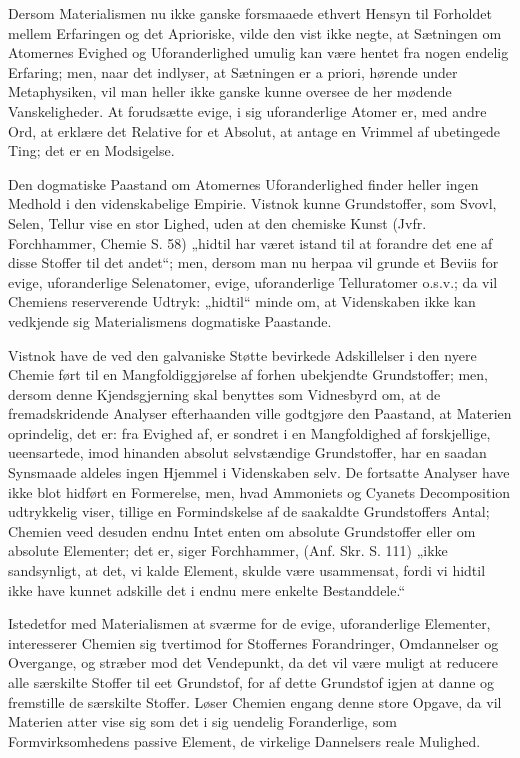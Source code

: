 \documentclass[12pt]{book}
\newcommand{\opage}[1]{\marginnote{\footnotesize\textit{[#1]}}}
\begin{document}
Dersom Materialismen nu ikke ganske forsmaaede ethvert Hensyn til Forholdet mellem Erfaringen og det
Aprioriske, vilde den vist ikke negte, at Sætningen om Atomernes Evighed og Uforanderlighed umulig kan
være hentet fra nogen endelig Erfaring; men, naar det indlyser, at Sætningen er a priori, hørende
under Metaphysiken, vil man heller ikke ganske kunne oversee de her mødende Vanskeligheder. At
forudsætte evige, i sig uforanderlige Atomer er, med andre
\opage{195} Ord, at erklære det Relative for et Absolut, at antage en Vrimmel af ubetingede Ting; det er en
Modsigelse.

Den dogmatiske Paastand om Atomernes Uforanderlighed finder heller ingen Medhold i den videnskabelige
Empirie. Vistnok kunne Grundstoffer, som Svovl, Selen, Tellur vise en stor Lighed, uden at den
chemiske Kunst (Jvfr. Forchhammer, Chemie S. 58) „hidtil har været istand til at forandre det ene af
disse Stoffer til det andet“; men, dersom man nu herpaa vil grunde et Beviis for evige, uforanderlige
Selenatomer, evige, uforanderlige Telluratomer o.s.v.; da vil Chemiens reserverende Udtryk: „hidtil“
minde om, at Videnskaben ikke kan vedkjende sig Materialismens dogmatiske Paastande.

Vistnok have de ved den galvaniske Støtte bevirkede Adskillelser i den nyere Chemie ført til en
Mangfoldiggjørelse af forhen ubekjendte Grundstoffer; men, dersom denne Kjendsgjerning skal benyttes
som Vidnesbyrd om, at de fremadskridende Analyser efterhaanden ville godtgjøre den Paastand, at
Materien oprindelig, det er: fra Evighed af, er sondret i en Mangfoldighed af forskjellige,
ueensartede, imod hinanden absolut selvstændige Grundstoffer, har en saadan Synsmaade aldeles ingen
Hjemmel i Videnskaben selv. De fortsatte Analyser have ikke blot hidført en Formerelse, men, hvad
Ammoniets og Cyanets Decomposition udtrykkelig viser, tillige en Formindskelse af de saakaldte
Grundstoffers Antal; Chemien veed
desuden endnu Intet enten om absolute Grundstoffer eller om absolute Elementer; det er, siger
Forchhammer, (Anf. Skr. S. 111) „ikke sandsynligt, at det, vi kalde Element, skulde være usammensat,
fordi vi hidtil ikke have kunnet adskille det i endnu mere enkelte Bestanddele.“

Istedetfor med Materialismen at sværme for de evige, uforanderlige Elementer, interesserer Chemien sig
tvertimod for Stoffernes Forandringer,
Omdannelser og Overgange, og stræber mod det Vendepunkt, da det vil være muligt at
\opage{196} reducere alle særskilte Stoffer til eet Grundstof, for af dette Grundstof igjen at danne og fremstille
de særskilte Stoffer. Løser Chemien engang denne store Opgave, da vil Materien atter vise sig som det
i sig uendelig Foranderlige, som Formvirksomhedens passive Element, de virkelige Dannelsers reale
Mulighed.
\end{document}
